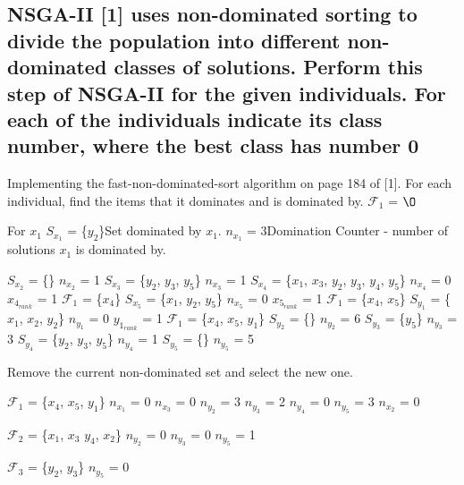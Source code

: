 \documentclass{article}
\newcommand\tab[1][1cm]{\hspace*{#1}}
\begin{document}
\subsection{NSGA-II [1] uses non-dominated sorting to divide the population into different non-dominated
classes of solutions. Perform this step of NSGA-II for the given individuals. For each of the individuals
indicate its class number, where the best class has number 0}

Implementing the fast-non-dominated-sort algorithm on page 184 of [1].
\smallbreak
For each individual, find the items that it dominates and is dominated by.
\bigbreak
$\mathcal{F}_1$ = $\O$
\bigbreak

For $x_1$
\smallbreak
 $S_{x_1}$ = \{$y_2$\}\tab Set dominated by $x_1$.
\smallbreak
 $n_{x_1}$ =  3\tab \tab Domination Counter - number of solutions $x_1$ is dominated by.

\bigbreak

 $S_{x_2}$ = \{\} 	
\smallbreak
 $n_{x_2}$ = 1	
\bigbreak
 $S_{x_3}$ = \{$y_2$, $y_3$, $y_5$\} 	
\smallbreak
 $n_{x_3}$ = 1	
\bigbreak
 $S_{x_4}$ = \{$x_1$, $x_3$, $y_2$, $y_3$, $y_4$, $y_5$\} 	
\smallbreak
 $n_{x_4}$ = 0	
\bigbreak
 $x_{4_{rank}}$ = 1
\smallbreak
 $\mathcal{F}_1$ = \{$x_4$\}
\bigbreak
 $S_{x_5}$ = \{$x_1$, $y_2$, $y_5$\} 	
\smallbreak
 $n_{x_5}$ = 0
\bigbreak
 $x_{5_{rank}}$ = 1
\smallbreak
 $\mathcal{F}_1$ = \{$x_4$, $x_5$\}
\bigbreak	
 $S_{y_1}$ = \{$x_1$, $x_2$, $y_2$\} 	
\smallbreak
 $n_{y_1}$ = 0
\bigbreak
 $y_{1_{rank}}$ = 1
\smallbreak
 $\mathcal{F}_1$ = \{$x_4$, $x_5$, $y_1$\}
\bigbreak
 $S_{y_2}$ = \{\} 	
\smallbreak
 $n_{y_2}$ = 6
\bigbreak
 $S_{y_3}$ = \{$y_5$\} 	
\smallbreak
 $n_{y_3}$ = 3
\bigbreak
 $S_{y_4}$ = \{$y_2$, $y_3$, $y_5$\} 	
\smallbreak
 $n_{y_4}$ = 1
\bigbreak
 $S_{y_5}$ = \{\} 
\smallbreak	
 $n_{y_5}$ = 5

\bigbreak
Remove the current non-dominated set and select the new one.
\bigbreak

$\mathcal{F}_1$ = \{$x_4$, $x_5$, $y_1$\}
\smallbreak
$n_{x_1}$ = 0
\smallbreak
$n_{x_3}$ = 0
\smallbreak
$n_{y_2}$ = 3
\smallbreak
$n_{y_3}$ = 2
\smallbreak
$n_{y_4}$ = 0
\smallbreak
$n_{y_5}$ = 3
\smallbreak
$n_{x_2}$ = 0

\bigbreak

$\mathcal{F}_2$ = \{$x_1$, $x_3$ $y_4$, $x_2$\}
\smallbreak
$n_{y_2}$ = 0
\smallbreak
$n_{y_3}$ = 0
\smallbreak
$n_{y_5}$ = 1

\bigbreak

$\mathcal{F}_3$ = \{$y_2$, $y_3$\}
\smallbreak
$n_{y_5}$ = 0
\end{document}
